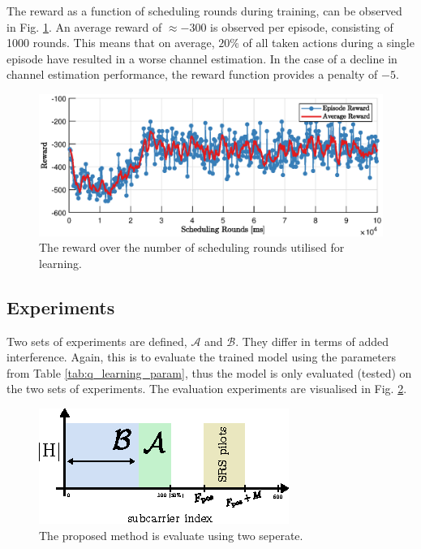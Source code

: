 The reward as a function of scheduling rounds during training, can be observed in Fig. \ref{fig:training_stats_qlearning}. An average reward of $\approx -300$ is observed per episode, consisting of 1000 rounds. This means that on average, $20\%$ of all taken actions during a single episode have resulted in a worse channel estimation. In the case of a decline in channel estimation performance, the reward function provides a penalty of $-5$. 
\begin{figure}
    \centering
    \includegraphics{chapters/part_uplink/figures/results/training_statistics.eps}
    \caption{The reward over the number of scheduling rounds utilised for learning. }\label{fig:training_stats_qlearning}
\end{figure}
\subsection{Experiments}
Two sets of experiments are defined, $\mathcal{A}$ and $\mathcal{B}$. They differ in terms of added interference. Again, this is to evaluate the trained model using the parameters from Table \ref{tab:q_learning_param}, thus the model is only evaluated (tested) on the two sets of experiments. The evaluation experiments are visualised in Fig. \ref{fig:subcarrier_index_experiment}.


\begin{figure}
    \centering
    \includegraphics{chapters/part_uplink/figures/subcarrier_index_experiment_setup.eps}
    \caption{The proposed method is evaluate using two seperate.}
    \label{fig:subcarrier_index_experiment}
\end{figure}


